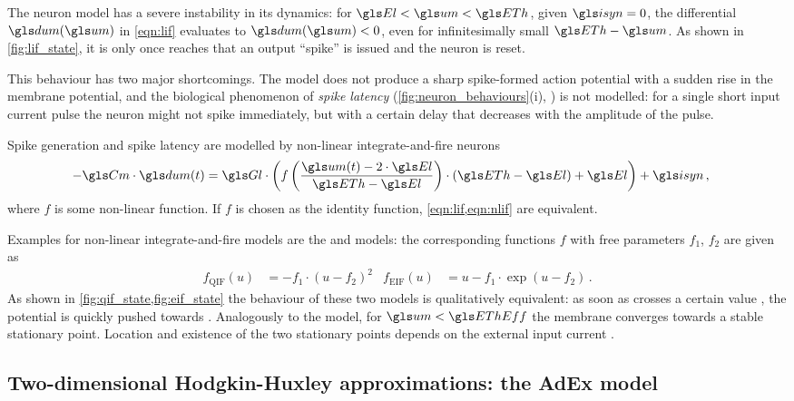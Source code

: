 The \LIF neuron model has a severe instability in its dynamics: for $\El < \um < \ETh$, given $\isyn=0$, the differential $\dum(\um)$ in \cref{eqn:lif} evaluates to $\dum(\um) < 0$, even for infinitesimally small $\ETh - \um$. As shown in \cref{fig:lif_state}, it is only once \um reaches \ETh that an output \enquote{spike} is issued and the neuron is reset.

This behaviour has two major shortcomings. The model does not produce a sharp spike-formed action potential with a sudden rise in the membrane potential, and the biological phenomenon of \emph{spike latency} (\cref{fig:neuron_behaviours}(i), \cite{izhikevich2004model}) is not modelled: for a single short input current pulse the neuron might not spike immediately, but with a certain delay that decreases with the amplitude of the pulse.

Spike generation and spike latency are modelled by non-linear integrate-and-fire neurons
\begin{align}
	- \Cm \cdot \dum(t) &= \Gl \cdot \left( f\left(\frac{\um(t) - 2 \cdot \El}{\ETh - \El}\right) \cdot (\ETh - \El) + \El \right) + \isyn
	\label{eqn:nlif} \,,
\end{align}
where $f$ is some non-linear function. If $f$ is chosen as the identity function, \cref{eqn:lif,eqn:nlif} are equivalent.

Examples for non-linear integrate-and-fire models are the \QIF and \EIF models: the corresponding functions $f$ with free parameters $f_1$, $f_2$ are given as
\begin{align}
	f_{\mathrm{QIF}}(u) &= - f_1 \cdot (u - f_2)^2
	& f_{\mathrm{EIF}}(u) &= u - f_1 \cdot \exp(u - f_2) \,.
	\label{eqn:nlif_f}
\end{align}
As shown in \cref{fig:qif_state,fig:eif_state} the behaviour of these two models is qualitatively equivalent: as soon as \um crosses a certain value \EThEff, the potential is quickly pushed towards \ETh. Analogously to the \LIF model, for $\um < \EThEff$ the membrane converges towards a stable stationary point. Location and existence of the two stationary points depends on the external input current \isyn.

\subsection{Two-dimensional Hodgkin-Huxley approximations: the AdEx model}
\label{sec:adex}


